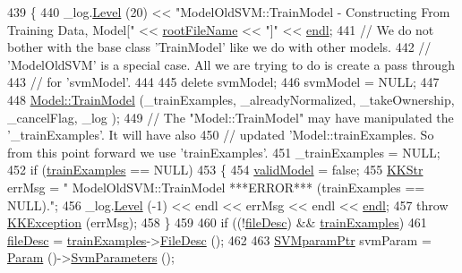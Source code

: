 \begin{DoxyCode}
439 \{
440   \_log.\hyperlink{class_k_k_b_1_1_run_log_a32cf761d7f2e747465fd80533fdbb659}{Level} (20) << \textcolor{stringliteral}{"ModelOldSVM::TrainModel - Constructing From Training Data, Model["} << 
      \hyperlink{class_k_k_m_l_l_1_1_model_a242173cd17f4a84ce1ee47fc7fabd9a2}{rootFileName} << \textcolor{stringliteral}{"]"} << \hyperlink{namespace_k_k_b_ad1f50f65af6adc8fa9e6f62d007818a8}{endl};
441   \textcolor{comment}{// We do not bother with the base class 'TrainModel' like we do with other models.}
442   \textcolor{comment}{// 'ModelOldSVM' is a special case.  All we are trying to do is create a pass through}
443   \textcolor{comment}{// for 'svmModel'.}
444 
445   \textcolor{keyword}{delete}  svmModel;
446   svmModel = NULL;
447 
448   \hyperlink{class_k_k_m_l_l_1_1_model_a1341c2cdd41a271e4b84ebf25838d389}{Model::TrainModel} (\_trainExamples, \_alreadyNormalized, \_takeOwnership, \_cancelFlag, \_log
      );
449   \textcolor{comment}{// The "Model::TrainModel" may have manipulated the '\_trainExamples'.  It will have also }
450   \textcolor{comment}{// updated 'Model::trainExamples.  So from this point forward we use 'trainExamples'.}
451   \_trainExamples = NULL;
452   \textcolor{keywordflow}{if}  (\hyperlink{class_k_k_m_l_l_1_1_model_a49f61d35489e1782cd31858fd0082f8e}{trainExamples} == NULL)
453   \{
454     \hyperlink{class_k_k_m_l_l_1_1_model_af881a051b703412686fa3b4a62b6d68a}{validModel} = \textcolor{keyword}{false};
455     \hyperlink{class_k_k_b_1_1_k_k_str}{KKStr} errMsg = \textcolor{stringliteral}{" ModelOldSVM::TrainModel  ***ERROR***    (trainExamples == NULL)."};
456     \_log.\hyperlink{class_k_k_b_1_1_run_log_a32cf761d7f2e747465fd80533fdbb659}{Level} (-1) << endl << errMsg << endl << \hyperlink{namespace_k_k_b_ad1f50f65af6adc8fa9e6f62d007818a8}{endl};
457     \textcolor{keywordflow}{throw} \hyperlink{class_k_k_b_1_1_k_k_exception}{KKException} (errMsg);
458   \}
459 
460   \textcolor{keywordflow}{if}  ((!\hyperlink{class_k_k_m_l_l_1_1_model_a65c48cd3601efe64e1431beba55e24f4}{fileDesc})  &&  \hyperlink{class_k_k_m_l_l_1_1_model_a49f61d35489e1782cd31858fd0082f8e}{trainExamples})
461     \hyperlink{class_k_k_m_l_l_1_1_model_a65c48cd3601efe64e1431beba55e24f4}{fileDesc} = \hyperlink{class_k_k_m_l_l_1_1_model_a49f61d35489e1782cd31858fd0082f8e}{trainExamples}->\hyperlink{class_k_k_m_l_l_1_1_feature_vector_list_a736923be9c4ac7553a5aa87dd24efd16}{FileDesc} ();
462 
463   \hyperlink{class_k_k_m_l_l_1_1_s_v_mparam}{SVMparamPtr} svmParam = \hyperlink{class_k_k_m_l_l_1_1_model_old_s_v_m_a4b63adb0ba6362c08692da815fe19ba7}{Param} ()->\hyperlink{class_k_k_m_l_l_1_1_model_param_old_s_v_m_ab825a03f88d332d83f37f6a3566215a1}{SvmParameters} ();

\end{DoxyCode}
